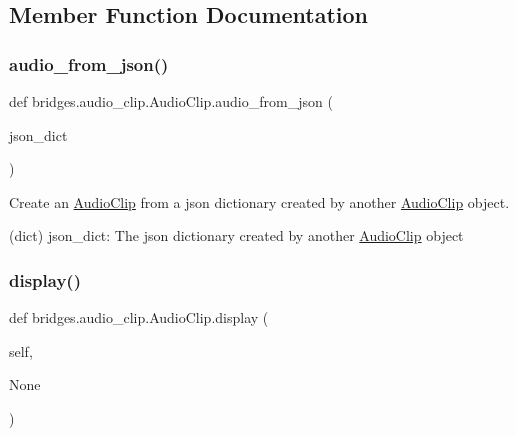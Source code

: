 \subsection{Member Function Documentation}
\mbox{\label{classbridges_1_1audio__clip_1_1_audio_clip_a3c60325b9493a6db3f4a76362c4c4e54}} 
\subsubsection{\texorpdfstring{audio\+\_\+from\+\_\+json()}{audio\_from\_json()}}
{\footnotesize\ttfamily def bridges.\+audio\+\_\+clip.\+Audio\+Clip.\+audio\+\_\+from\+\_\+json (\begin{DoxyParamCaption}\item[{}]{json\+\_\+dict }\end{DoxyParamCaption})}



Create an \hyperlink{classbridges_1_1audio__clip_1_1_audio_clip}{Audio\+Clip} from a json dictionary created by another \hyperlink{classbridges_1_1audio__clip_1_1_audio_clip}{Audio\+Clip} object. 

(dict) json\+\_\+dict\+: The json dictionary created by another \hyperlink{classbridges_1_1audio__clip_1_1_audio_clip}{Audio\+Clip} object \mbox{\label{classbridges_1_1audio__clip_1_1_audio_clip_aa6f7d21f1ab5296f8d0df267c12aea4a}} 
\subsubsection{\texorpdfstring{display()}{display()}}
{\footnotesize\ttfamily def bridges.\+audio\+\_\+clip.\+Audio\+Clip.\+display (\begin{DoxyParamCaption}\item[{}]{self,  }\item[{}]{None }\end{DoxyParamCaption})}



